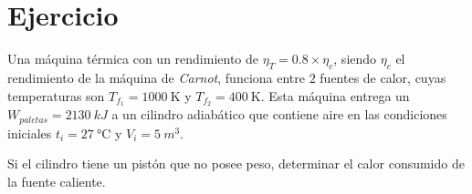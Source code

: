 \section{Ejercicio}\label{ej:Chap07Ejercicio25}
Una máquina térmica con un rendimiento de $\eta_T=0.8 \times \eta_c$, siendo $\eta_c$ el rendimiento de la máquina de \textit{Carnot}, funciona entre $2$ fuentes de calor, cuyas temperaturas son $T_{f_1}=\SI{1000}{\kelvin}$ y $T_{f_2}=\SI{400}{\kelvin}$. Esta máquina entrega un $W_{paletas}=\SI{2130}{kJ}$ a un cilindro adiabático que contiene aire en las condiciones iniciales $t_i=\SI{27}{\celsius}$ y $V_i=\SI{5}{m^3}$.

Si el cilindro tiene un pistón que no posee peso, determinar el calor consumido de la fuente caliente.